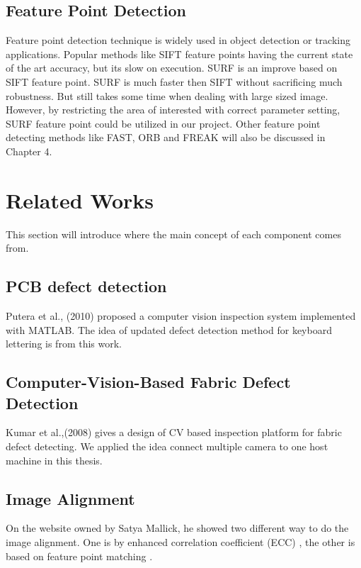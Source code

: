     \subsection{Feature Point Detection}
        Feature point detection technique is widely used in object detection or tracking applications.
        Popular methods like SIFT feature points having the current state of the art accuracy, but its slow on execution.
        SURF is an improve based on SIFT feature point. SURF is much faster then SIFT without sacrificing much robustness. But still takes some time when dealing with large sized image. 
        However, by restricting the area of interested with correct parameter setting, SURF feature point could be utilized in our project.
        Other feature point detecting methods like FAST, ORB and FREAK will also be discussed in Chapter 4.

\section{Related Works} 
    This section will introduce where the main concept of each component comes from.
    \subsection{PCB defect detection}
        Putera et al., \cite{putera2010printed} (2010) proposed a computer vision inspection system implemented with MATLAB.
        The idea of updated defect detection method for keyboard lettering is from this work.

    \subsection{Computer-Vision-Based Fabric Defect Detection}
        Kumar et al.,(2008)\cite{kumar2008computer} gives a design of CV based inspection platform for fabric defect detecting.
        We applied the idea connect multiple camera to one host machine in this thesis.

    \subsection{Image Alignment}
        On the website owned by Satya Mallick, he showed two different way to do the image alignment.
        One is by enhanced correlation coefficient (ECC) \cite{ECC_Alignment}, the other is based on feature point matching \cite{featureBasedAlignment}.

